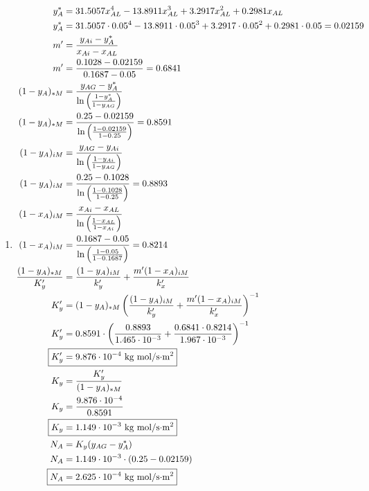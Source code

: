 \documentclass[12pt]{article}
\begin{document}
\begin{enumerate}
\begin{enumerate}
        \item 
        \begin{align*}
            y_A^* &= 31.5057 x_{AL}^4 - 13.8911 x_{AL}^3 + 3.2917 x_{AL}^2 + 0.2981 x_{AL} \\ 
            y_A^* &= 31.5057 \cdot 0.05^4 - 13.8911 \cdot 0.05^3 + 3.2917 \cdot 0.05^2 + 0.2981 \cdot 0.05 = 0.02159 \\
            m' &= \frac{y_{Ai} - y_A^*}{x_{Ai} - x_{AL}} \\
            m' &= \frac{0.1028 - 0.02159}{0.1687 - 0.05} = 0.6841\\
            (1 - y_A)_{*M} &= \frac{y_{AG} - y_A^*}{\ln\left(\frac{1 - y_A^*}{1 - y_{AG}}\right)} \\
            (1 - y_A)_{*M} &= \frac{0.25 - 0.02159}{\ln\left(\frac{1 - 0.02159}{1 - 0.25}\right)} = 0.8591 \\ 
            (1 - y_{A})_{iM} &= \frac{y_{AG} - y_{Ai}}{\ln\left(\frac{1 - y_{Ai}}{1 - y_{AG}}\right)} \\ 
            (1 - y_{A})_{iM} &= \frac{0.25 - 0.1028}{\ln\left(\frac{1 - 0.1028}{1 - 0.25}\right)} = 0.8893 \\ 
            (1 - x_{A})_{iM} &= \frac{x_{Ai} - x_{AL}}{\ln\left(\frac{1 - x_{AL}}{1 - x_{Ai}}\right)} \\
            (1 - x_{A})_{iM} &= \frac{0.1687 - 0.05}{\ln\left(\frac{1 - 0.05}{1 - 0.1687}\right)} = 0.8214 \\
            \frac{(1 - y_A)_{*M}}{K_y'} &= \frac{(1 - y_{A})_{iM}}{k_y'} + \frac{m' (1 - x_{A})_{iM}}{k_x'} \\
            K_y' &= (1 - y_A)_{*M} \left(\frac{(1 - y_{A})_{iM}}{k_y'} + \frac{m' (1 - x_{A})_{iM}}{k_x'}\right)^{-1} \\
            K_y' &= 0.8591 \cdot \left(\frac{0.8893}{1.465 \cdot 10^{-3}} + \frac{0.6841 \cdot 0.8214}{1.967 \cdot 10^{-3}}\right)^{-1} \\
            \Aboxed{K_y' &= 9.876 \cdot 10^{-4} \text{ kg mol/s$\cdot$m$^2$}} \\
            K_y &= \frac{K_y'}{(1 - y_A)_{*M}} \\
            K_y &= \frac{9.876 \cdot 10^{-4}}{0.8591} \\
            \Aboxed{K_y &= 1.149 \cdot 10^{-3} \text{ kg mol/s$\cdot$m$^2$}} \\
            N_A &= K_y (y_{AG} - y_A^*) \\
            N_A &= 1.149 \cdot 10^{-3} \cdot (0.25 - 0.02159) \\
            \Aboxed{N_A &= 2.625 \cdot 10^{-4} \text{ kg mol/s$\cdot$m$^2$}}
        \end{align*}


\end{enumerate}
\end{enumerate}
\end{document}

